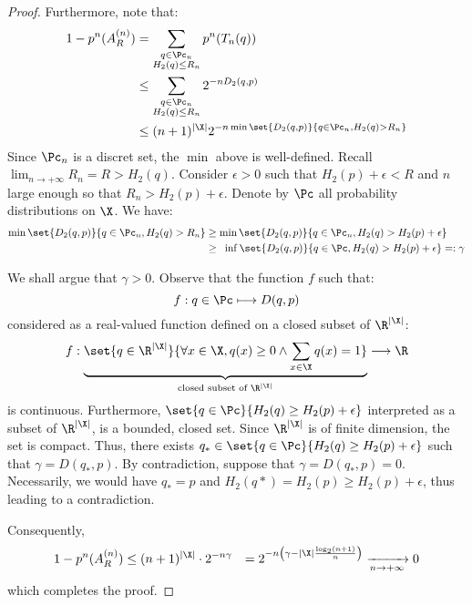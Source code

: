 \documentclass[toc]{../cs-classes/cs-classes}
\begin{document}
\begin{proof}
    Furthermore, note that:
    \begin{equation*}
        \begin{aligned}
            1- p^n(A_R^{(n)}) &= \sum_{\substack{q\in\Pc_n\\H_2(q)\leq R_n}} p^n(T_n(q))\\
            &\leq \sum_{\substack{q\in\Pc_n\\H_2(q)\leq R_n}} 2^{-nD_2(q, p)}\\
            &\leq (n+1)^{|\X|}2^{-n\min\set{D_2(q, p)}{q\in\Pc_n, H_2(q)>R_n}}
        \end{aligned}
    \end{equation*}
    Since $\Pc_n$ is a discret set, the $\min$ above is well-defined. Recall $\lim_{n\to+\infty}R_n=R>H_2(q)$. Consider $\epsilon>0$ such that $H_2(p)+\epsilon<R$ and $n$ large enough so that $R_n>H_2(p)+\epsilon$. Denote by $\Pc$ all probability distributions on $\X$. We have:
    \begin{equation*}
        \begin{aligned}
            \min\set{D_2(q, p)}{q\in\Pc_n, H_2(q)>R_n} 
            &\geq \min\set{D_2(q, p)}{q\in\Pc_n, H_2(q)>H_2(p)+\epsilon}\\
            &\geq \phantom{i}\inf\set{D_2(q, p)}{q\in\Pc, H_2(q)>H_2(p)+\epsilon} =: \gamma
        \end{aligned}
    \end{equation*}

    We shall argue that $\gamma>0$. Observe that the function $f$ such that:
    \begin{equation*}
        f:q\in\Pc \longmapsto D(q, p)
    \end{equation*}
    considered as a real-valued function defined on a closed subset of $\R^{|\X|}$:
    \begin{equation*}
        f : \underbrace{\set{q\in\R^{|\X|}}{\forall x\in\X, q(x)\geq 0 \land \sum_{x\in\X} q(x) = 1}}_{\textnormal{closed subset of }\R^{|\X|}} \longrightarrow \R
    \end{equation*}
    is continuous. Furthermore, $\set{q\in\Pc}{H_2(q)\geq H_2(p)+\epsilon}$ interpreted as a subset of $\R^{|\X|}$, is a bounded, closed set. Since $\R^{|\X|}$ is of finite dimension, the set is compact. Thus, there exists $q_*\in\set{q\in\Pc}{H_2(q)\geq H_2(p)+\epsilon}$ such that $\gamma=D(q_*, p)$. By contradiction, suppose that $\gamma=D(q_*, p)=0$. Necessarily, we would have $q_*=p$ and $H_2(q*)=H_2(p)\geq H_2(p)+\epsilon$, thus leading to a contradiction. 
    
    Consequently,
    \begin{equation*}
        \begin{aligned}
            1-p^n(A_R^{(n)}) &\leq (n+1)^{|\X|}\cdot 2^{-n\gamma}
            &= 2^{-n\left(\gamma-|\X|\frac{\log_2(n+1)}{n}\right)} \xrightarrow[n\to+\infty]{} 0
        \end{aligned}
    \end{equation*}
    which completes the proof.
\end{proof}
\end{document}
